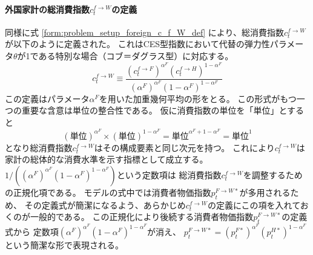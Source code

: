 \paragraph{外国家計の総消費指数\(c_t^{f\to W}\)の定義}
\label{sec:chapter3_households_stage1b_foreign_c_f_W_definition}
同様に式
\eqref{form:problem_setup_foreign_c_f_W_def}
により、総消費指数\(c_t^{f\to W}\)が以下のように定義された。
これはCES型指数において代替の弾力性パラメータ\(\theta\)が1である特別な場合（コブ＝ダグラス型）に対応する。
\begin{equation}
\label{form:chapter3_households_stage1b_foreign_c_f_W_definition_def}
    c_t^{f\to W}\equiv\frac{(c_t^{f\to F})^{\alpha^F}(c_t^{f\to H})^{1-\alpha^F}}{(\alpha^F)^{\alpha^F}(1-\alpha^F)^{1-\alpha^F}}
\end{equation}
この定義はパラメータ\(\alpha^F\)を用いた加重幾何平均の形をとる。
この形式がもつ一つの重要な含意は単位の整合性である。
仮に消費指数の単位を「単位」とすると
\begin{equation}
\label{form:chapter3_households_stage1b_foreign_c_f_W_definition_unit_id}
    (\text{単位})^{\alpha^F}\times(\text{単位})^{1-\alpha^F}=\text{単位}^{\alpha^F+1-\alpha^F}=\text{単位}^1
\end{equation}
となり総消費指数\(c_t^{f\to W}\)はその構成要素と同じ次元を持つ。
これにより\(c_t^{f\to W}\)は家計の総体的な消費水準を示す指標として成立する。
\(1/\left((\alpha^F)^{\alpha^F}(1-\alpha^F)^{1-\alpha^F}\right)\)という定数項は
総消費指数\(c_t^{f\to W}\)を調整するための正規化項である。
モデルの式中では消費者物価指数\(p_t^{F\to W*}\)が多用されるため、
その定義式が簡潔になるよう、あらかじめ\(c_t^{f\to W}\)の定義にこの項を入れておくのが一般的である。
この正規化により後続する消費者物価指数\(p_t^{F\to W*}\)の定義式から
定数項\((\alpha^F)^{\alpha^F}(1-\alpha^F)^{1-\alpha^F}\)が消え、
\(p_t^{F\to W*}=(p_t^{F*})^{\alpha^F}(p_t^{H*})^{1-\alpha^F}\)という簡潔な形で表現される。

